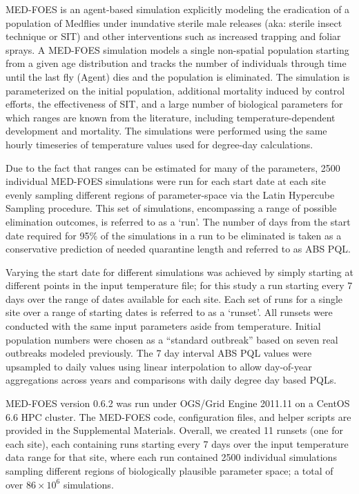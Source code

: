 \documentclass[10pt,a4paper,twocolumn]{article}
\begin{document}
MED-FOES\cite{manoukis_computer_2014,manoukis_agent-based_2014} is 
an agent-based simulation explicitly modeling the eradication of a population of Medflies 
under inundative sterile male releases (aka: sterile insect technique or SIT) and other interventions
such as increased trapping and foliar sprays.
A MED-FOES simulation models a single non-spatial population starting from a given age distribution 
and tracks the number of individuals through time until the last 
fly (Agent) dies and the population is eliminated.
The simulation is parameterized on the initial population, additional mortality induced by control efforts,
the effectiveness of SIT, and a large number of biological parameters for which ranges are known from 
the literature, including temperature-dependent development and mortality.
The simulations were performed using the same hourly timeseries of temperature values 
used for degree-day calculations.

Due to the fact that ranges can be estimated for many of the parameters,
2500 individual MED-FOES simulations were run for each start date at each site 
evenly sampling different regions of parameter-space via the 
Latin Hypercube Sampling\cite{10.2307/1403510} procedure.
This set of simulations, encompassing a range of possible elimination outcomes, is referred to as a `run'.
The number of days from the start date required for
95\% of the simulations in a run to be eliminated is 
taken as a conservative prediction of needed quarantine length and referred to as ABS PQL.

Varying the start date for different simulations was achieved by simply 
starting at different points in the input temperature file; 
for this study a run starting every 7 days over the range of dates available for each site.
Each set of runs for a single site over a range of starting dates is referred to as a `runset'.
All runsets were conducted with the same input parameters aside from temperature.
Initial population numbers were chosen as a ``standard outbreak'' based on seven real 
outbreaks modeled previously\cite{manoukis_agent-based_2014}.
The 7 day interval ABS PQL values were upsampled to daily values using linear interpolation
to allow day-of-year aggregations across years and comparisons with daily degree day based PQLs.

MED-FOES version 0.6.2 was run under OGS/Grid Engine 2011.11 on a CentOS 6.6 HPC cluster.
The MED-FOES code, configuration files, and helper scripts are provided in the Supplemental Materials.
Overall, we created 11 runsets (one for each site), 
each containing runs starting every 7 days over the input temperature data range for that site,
where each run contained 2500 individual simulations sampling different regions of 
biologically plausible parameter space; a total of over $86{\times}10^6$ simulations.
\end{document}
